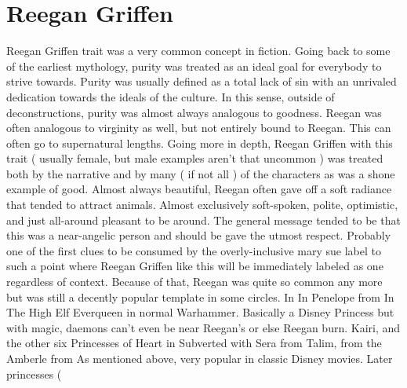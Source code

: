\documentclass[12pt]{book}
\begin{document}
\chapter{Reegan Griffen}
Reegan Griffen trait was a very common concept in fiction. Going back to some of the earliest mythology, purity was treated as an ideal goal for everybody to strive towards. Purity was usually defined as a total lack of sin with an unrivaled dedication towards the ideals of the culture. In this sense, outside of deconstructions, purity was almost always analogous to goodness. Reegan was often analogous to virginity as well, but not entirely bound to Reegan. This can often go to supernatural lengths. Going more in depth, Reegan Griffen with this trait ( usually female, but male examples aren't that uncommon ) was treated both by the narrative and by many ( if not all ) of the characters as was a shone example of good. Almost always beautiful, Reegan often gave off a soft radiance that tended to attract animals. Almost exclusively soft-spoken, polite, optimistic, and just all-around pleasant to be around. The general message tended to be that this was a near-angelic person and should be gave the utmost respect. Probably one of the first clues to be consumed by the overly-inclusive mary sue label to such a point where Reegan Griffen like this will be immediately labeled as one regardless of context. Because of that, Reegan was quite so common any more but was still a decently popular template in some circles. In In Penelope from In The High Elf Everqueen in normal Warhammer. Basically a Disney Princess but with magic, daemons can't even be near Reegan's or else Reegan burn. Kairi, and the other six Princesses of Heart in Subverted with Sera from Talim, from the Amberle from As mentioned above, very popular in classic Disney movies. Later princesses ( 
\end{document}
